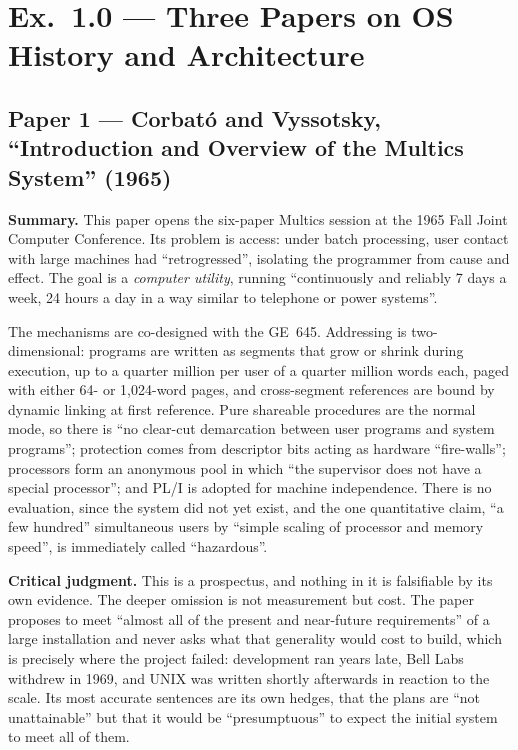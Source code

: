 \section*{Ex.\ 1.0 --- Three Papers on OS History and Architecture}

\subsection*{Paper 1 --- Corbat\'o and Vyssotsky, ``Introduction and Overview of the Multics System'' (1965)}
\label{p4:sec:multics}

\textbf{Summary.} This paper opens the six-paper Multics session at the 1965 Fall Joint
Computer Conference. Its problem is access: under batch processing, user contact with large
machines had ``retrogressed'', isolating the programmer from cause and effect. The goal is
a \emph{computer utility}, running ``continuously and reliably 7 days a week, 24 hours a
day in a way similar to telephone or power systems''.

The mechanisms are co-designed with the GE~645. Addressing is two-dimensional: programs are
written as segments that grow or shrink during execution, up to a quarter million per user
of a quarter million words each, paged with either 64- or 1{,}024-word pages, and
cross-segment references are bound by dynamic linking at first reference. Pure shareable
procedures are the normal mode, so there is ``no clear-cut demarcation between user
programs and system programs''; protection comes from descriptor bits acting as hardware
``fire-walls''; processors form an anonymous pool in which ``the supervisor does not have a
special processor''; and PL/I is adopted for machine independence. There is no evaluation,
since the system did not yet exist, and the one quantitative claim, ``a few hundred''
simultaneous users by ``simple scaling of processor and memory speed'', is immediately
called ``hazardous''.

\textbf{Critical judgment.} This is a prospectus, and nothing in it is falsifiable by its
own evidence. The deeper omission is not measurement but cost. The paper proposes to meet
``almost all of the present and near-future requirements'' of a large installation and
never asks what that generality would cost to build, which is precisely where the project
failed: development ran years late, Bell Labs withdrew in 1969, and UNIX was written
shortly afterwards in reaction to the scale. Its most accurate sentences are its own
hedges, that the plans are ``not unattainable'' but that it would be ``presumptuous'' to
expect the initial system to meet all of them.

